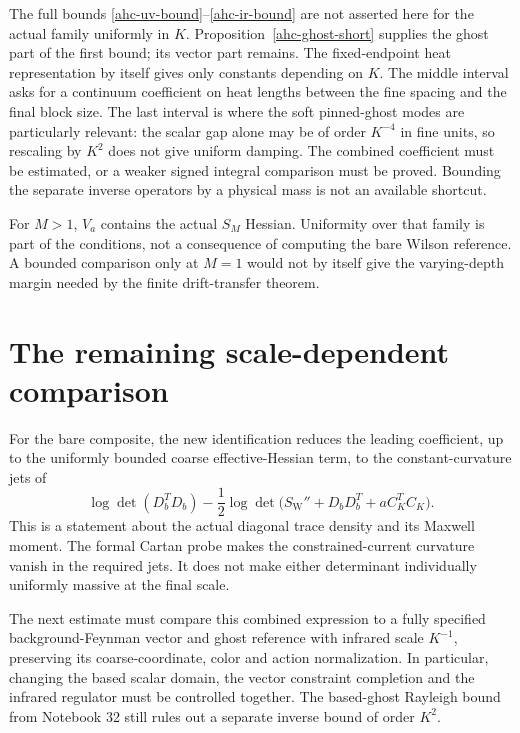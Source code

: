 \documentclass[11pt]{article}
\theoremstyle{remark}
\begin{document}
The full bounds \eqref{ahc-uv-bound}--\eqref{ahc-ir-bound}
are not asserted here for the actual family uniformly in
\(K\). Proposition~\ref{ahc-ghost-short} supplies the
ghost part of the first bound; its vector part remains.
The fixed-endpoint heat representation by itself gives
only constants depending on \(K\). The middle interval asks for a
continuum coefficient on heat lengths between the
fine spacing and the final block size. The last
interval is where the soft pinned-ghost modes are
particularly relevant: the scalar gap alone may be
of order \(K^{-4}\) in fine units, so rescaling by
\(K^2\) does not give uniform damping. The combined
coefficient must be estimated, or a weaker signed
integral comparison must be proved. Bounding the
separate inverse operators by a physical mass is
not an available shortcut.

For \(M>1\), \(V_a\) contains the actual \(S_M\)
Hessian. Uniformity over that family is part of the
conditions, not a consequence of computing the bare
Wilson reference. A bounded comparison only at \(M=1\)
would not by itself give the varying-depth margin
needed by the finite drift-transfer theorem.



\section{The remaining scale-dependent comparison}
\label{ctn-next}

For the bare composite, the new identification reduces
the leading coefficient, up to the uniformly bounded
coarse effective-Hessian term, to the constant-curvature
jets of
\[
 \log\det(D_b^TD_b)
 -\frac12\log\det
       \bigl(S_{\mathrm W}''+D_bD_b^T+aC_K^TC_K\bigr).
\]
This is a statement about the actual diagonal trace density
and its Maxwell moment. The formal Cartan probe makes
the constrained-current curvature vanish in the required
jets. It does not make either determinant individually
uniformly massive at the final scale.

The next estimate must compare this combined expression
to a fully specified background-Feynman vector and ghost
reference with infrared scale \(K^{-1}\), preserving its
coarse-coordinate, color and action normalization. In
particular, changing the based scalar domain, the vector
constraint completion and the infrared regulator must
be controlled together. The based-ghost Rayleigh bound
from Notebook 32 still rules out a separate inverse
bound of order \(K^2\).
\end{document}
